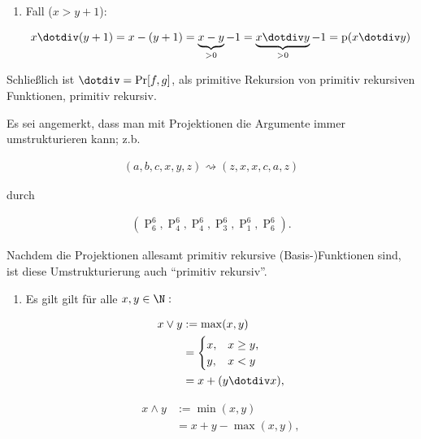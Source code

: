 \begin{solution}
\begin{enumerate}[label = (\alph*)]
\begin{enumerate}[label = \arabic*.]
        \item Fall ($x > y + 1$):
            
        \begin{align*}
            x \dotdiv (y + 1)
            =
            x - (y + 1)
            =
            \underbrace{x - y}_{> 0} - 1
            =
            \underbrace{x \dotdiv y}_{> 0} - 1
            =
            \operatorname p(x \dotdiv y)
        \end{align*}    

    \end{enumerate}

    Schließlich ist $\operatorname \dotdiv = \Pr[f, g]$, als primitive Rekursion von primitiv rekursiven Funktionen, primitiv rekursiv.

\end{enumerate}

Es sei angemerkt, dass man mit Projektionen die Argumente immer umstrukturieren kann;
z.b.

\begin{align*}
    (a, b, c, x, y, z) \rightsquigarrow (z, x, x, c, a, z)
\end{align*}

durch

\begin{align*}
    (\operatorname P_6^6, \operatorname P_4^6, \operatorname P_4^6, \operatorname P_3^6, \operatorname P_1^6, \operatorname P_6^6).
\end{align*}

Nachdem die Projektionen allesamt primitiv rekursive (Basis-)Funktionen sind, ist diese Umstrukturierung auch \enquote{primitiv rekursiv}.

\begin{enumerate}[label = (\alph*), start = 4]

    \item Es gilt gilt für alle $x, y \in \N:$
    

    \begin{align*}
        x \lor y
        & :=
        \max(x, y) \\
        & =
        \begin{cases}
            x, & x \geq y, \\
            y, & x < y
        \end{cases} \\
        & =
        x + (y \dotdiv x),
    \end{align*}

    \begin{align*}
        x \land y
        & :=
        \min(x, y) \\
        & =
        x + y - \max(x, y),
    \end{align*}


\end{enumerate}
\end{solution}
